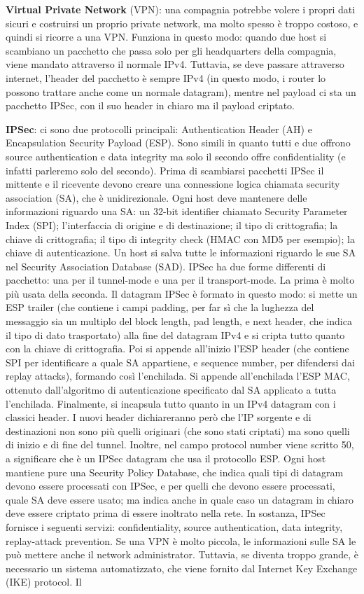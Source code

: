 \documentclass[a4paper,10pt]{article} %
\renewcommand{\b}[1]{%
    {\textbf{#1}}}
\begin{document}
\b{Virtual Private Network} (VPN): una compagnia potrebbe volere i propri dati sicuri e costruirsi un proprio private network, ma molto spesso è troppo costoso, e quindi si ricorre a una VPN. Funziona in questo modo: quando due host si scambiano un pacchetto che passa solo per gli headquarters della compagnia, viene mandato attraverso il normale IPv4. Tuttavia, se deve passare attraverso internet, l'header del pacchetto è sempre IPv4 (in questo modo, i router lo possono trattare anche come un normale datagram), mentre nel payload ci sta un pacchetto IPSec, con il suo header in chiaro ma il payload criptato.

\b{IPSec}: ci sono due protocolli principali: Authentication Header (AH) e Encapsulation Security Payload (ESP). Sono simili in quanto tutti e due offrono source authentication e data integrity ma solo il secondo offre confidentiality (e infatti parleremo solo del secondo). Prima di scambiarsi pacchetti IPSec il mittente e il ricevente devono creare una connessione logica chiamata security association (SA), che è unidirezionale. Ogni host deve mantenere delle informazioni riguardo una SA: un 32-bit identifier chiamato Security Parameter Index (SPI); l'interfaccia di origine e di destinazione; il tipo di crittografia; la chiave di crittografia; il tipo di integrity check (HMAC con MD5 per esempio); la chiave di autenticazione. Un host si salva tutte le informazioni riguardo le sue SA nel Security Association Database (SAD). IPSec ha due forme differenti di pacchetto: una per il tunnel-mode e una per il transport-mode. La prima è molto più usata della seconda. Il datagram IPSec è formato in questo modo: si mette un ESP trailer (che contiene i campi padding, per far sì che la lughezza del messaggio sia un multiplo del block length,  pad length, e next header, che indica il tipo di dato trasportato) alla fine del datagram IPv4 e si cripta tutto quanto con la chiave di crittografia.  Poi si appende all'inizio l'ESP header (che contiene SPI per identificare a quale SA appartiene, e sequence number, per difendersi dai replay attacks), formando così l'enchilada. Si appende all'enchilada l'ESP MAC, ottenuto dall'algoritmo di autenticazione specificato dal SA applicato a tutta l'enchilada. Finalmente, si incapsula tutto quanto in un IPv4 datagram con i classici header. I nuovi header dichiareranno però che l'IP sorgente e di destinazioni non sono più quelli originari (che sono stati criptati) ma sono quelli di inizio e di fine del tunnel. Inoltre, nel campo protocol number viene scritto 50, a significare che è un IPSec datagram che usa il protocollo ESP. Ogni host mantiene pure una Security Policy Database, che indica quali tipi di datagram devono essere processati con IPSec, e per quelli che devono essere processati, quale SA deve essere usato; ma indica anche in quale caso un datagram in chiaro deve essere criptato prima di essere inoltrato nella rete. In sostanza, IPSec fornisce i seguenti servizi: confidentiality, source authentication, data integrity, replay-attack prevention. Se una VPN è molto piccola, le informazioni sulle SA le può mettere anche il network administrator. Tuttavia, se diventa troppo grande, è necessario un sistema automatizzato, che viene fornito dal Internet Key Exchange (IKE) protocol. Il 
\end{document}
